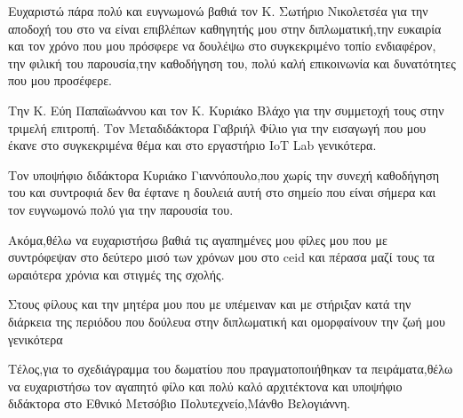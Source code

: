 \begin{acknowledgements}

Ευχαριστώ πάρα πολύ και ευγνωμονώ βαθιά τον Κ. Σωτήριο Νικολετσέα για την
αποδοχή του στο να είναι επιβλέπων καθηγητής μου στην διπλωματική,την ευκαιρία
και τον χρόνο που μου πρόσφερε να δουλέψω στο συγκεκριμένο τοπίο ενδιαφέρον, την
φιλική του παρουσία,την καθοδήγηση του, πολύ καλή επικοινωνία και δυνατότητες
που μου προσέφερε.

Την Κ. Εύη Παπαϊωάννου και τον Κ. Κυριάκο Βλάχο για την
συμμετοχή τους στην τριμελή επιτροπή. Τον Μεταδιδάκτορα Γαβριήλ Φίλιο για την
εισαγωγή που μου έκανε στο συγκεκριμένα θέμα και στο εργαστήριο IoT Lab γενικότερα. 

Τον υποψήφιο διδάκτορα Κυριάκο Γιαννόπουλο,που χωρίς την συνεχή καθοδήγηση του και συντροφιά
δεν θα έφτανε η δουλειά αυτή στο σημείο που είναι σήμερα και τον ευγνωμονώ πολύ για
την παρουσία του.

Ακόμα,θέλω να ευχαριστήσω βαθιά τις αγαπημένες μου φίλες μου που με συντρόφεψαν στο δεύτερο μισό των χρόνων μου στο ceid και πέρασα μαζί τους τα ωραιότερα
χρόνια και στιγμές της σχολής.

Στους φίλους και την μητέρα μου που με υπέμειναν
και με στήριξαν κατά την διάρκεια της περιόδου που δούλευα στην διπλωματική και
ομορφαίνουν την ζωή μου γενικότερα 

Τέλος,για το σχεδιάγραμμα του δωματίου που
πραγματοποιήθηκαν τα πειράματα,θέλω να ευχαριστήσω τον αγαπητό φίλο και πολύ
καλό αρχιτέκτονα και υποψήφιο  διδάκτορα στο Εθνικό Μετσόβιο Πολυτεχνείο,Μάνθο Βελογιάννη.



\end{acknowledgements}